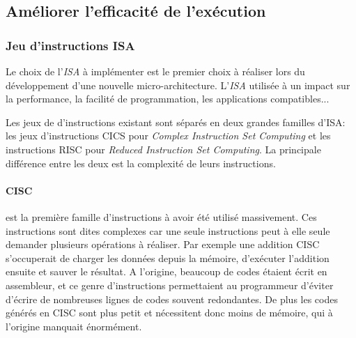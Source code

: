 \subsection{Améliorer l'efficacité de l'exécution} \label{sec:efficacite}




\subsubsection{Jeu d'instructions ISA } \label{sec:isa}

Le choix de l'\textit{ISA} à implémenter est le premier choix à réaliser lors du développement d'une nouvelle micro-architecture. L'\textit{ISA} utilisée à un impact sur la performance, la facilité de programmation, les applications compatibles...

Les jeux de d'instructions existant sont séparés en deux grandes familles d'ISA: les jeux d'instructions CICS pour \textit{Complex Instruction Set Computing} et les instructions RISC pour \textit{Reduced Instruction Set Computing}. La principale différence entre les deux est la complexité de leurs instructions. 

    \paragraph{CISC} est la première famille d'instructions à avoir été utilisé massivement. Ces instructions sont dites complexes car une seule instructions peut à elle seule demander plusieurs opérations à réaliser. Par exemple une addition CISC s'occuperait de charger les données depuis la mémoire, d'exécuter l'addition ensuite et sauver le résultat. A l'origine, beaucoup de codes étaient écrit en assembleur, et ce genre d'instructions permettaient au programmeur d'éviter d'écrire de nombreuses lignes de codes souvent redondantes. De plus les codes générés en CISC sont plus petit et nécessitent donc moins de mémoire, qui à l'origine manquait énormément.

